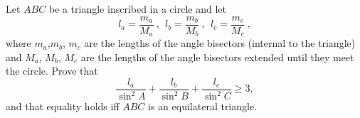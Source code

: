 Let $ABC$ be a triangle inscribed in a circle and let \[ l_a = \frac{m_a}{M_a} \ , \ \ l_b = \frac{m_b}{M_b} \ , \ \ l_c = \frac{m_c}{M_c} \ ,  \] where $m_a$,$m_b$, $m_c$ are the lengths of the angle bisectors (internal to the triangle) and $M_a$, $M_b$, $M_c$ are the lengths of the angle bisectors extended until they meet the circle.  Prove that \[ \frac{l_a}{\sin^2 A} + \frac{l_b}{\sin^2 B} + \frac{l_c}{\sin^2 C} \geq 3,  \] and that equality holds iff $ABC$ is an equilateral triangle.